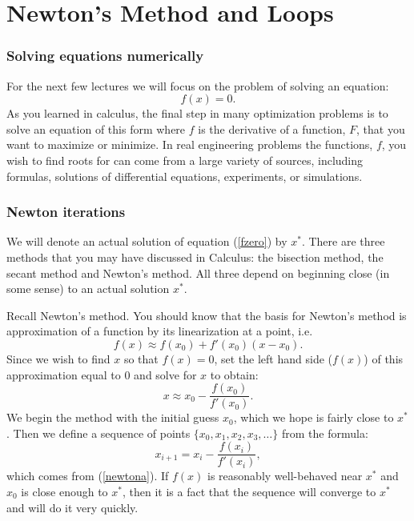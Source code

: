 

\chapter{Newton's Method and Loops}
\label{lec:newton}


\subsection*{Solving equations numerically}

For the next few lectures we will focus on the problem of solving an
equation:
\begin{equation}\label{fzero}
     f(x) = 0.
\end{equation}
As you learned in calculus, the final step in many optimization
problems is to solve an equation of this form where $f$ is the
derivative of a function, $F$, that you want
to maximize or minimize. In real engineering problems the
functions, $f$, you wish to find roots for can come from a large variety of
sources, including formulas, solutions of differential equations, experiments,
or simulations.



\subsection*{Newton iterations}

We will denote an actual solution of equation (\ref{fzero}) by $x^*$.
There are three methods that you may have discussed in Calculus:
the bisection method, the secant method and Newton's method. All
three depend on beginning close (in some sense) to an actual solution
$x^*$.

Recall Newton's method. You should know that the basis for
Newton's method is approximation of a function by its linearization
at a point, i.e.
\begin{equation}\label{linapp}
f(x) \approx f(x_0) + f'(x_0)(x-x_0).
\end{equation}
Since we wish to find $x$ so that $f(x) =0$, set the left hand side ($f(x)$)
of this approximation equal to $0$ and solve for $x$ to obtain:
\begin{equation}\label{newtona}
x \approx x_0 - \frac{f(x_0)}{f'(x_0)}.
\end{equation}
We begin the method with the initial guess
$x_0$, which we hope is fairly close to $x^*$.
Then we define a sequence of points $\{x_0, x_1, x_2, x_3, \ldots \}$
from the formula:
\begin{equation}\label{newton}
x_{i+1} = x_i - \frac{f(x_i)}{f'(x_i)},
\end{equation}
which comes from (\ref{newtona}).
If $f(x)$ is reasonably well-behaved near $x^*$ and $x_0$ is
close enough to $x^*$, then it is a fact that the sequence will
converge to $x^*$ and will do it very quickly.


